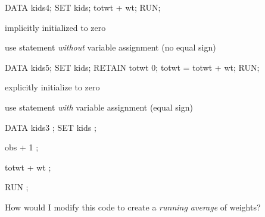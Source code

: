 \begin{frame}[fragile]
\footnotesize
\begin{code}{.0}
DATA kids4;
   SET kids;
   totwt + wt;
RUN;

\end{code}
\bi
\item {} implicitly initialized to zero
\item use  statement \emph{without} variable assignment (no equal sign)
\ei
\emp
{} \hspace{0.05in} \emp
{}
\footnotesize
\begin{code}{.0}
DATA kids5;
   SET kids;
   RETAIN totwt 0;
   totwt = totwt + wt;
RUN;
\end{code}
\bi
\item explicitly initialize  to zero
\item use  statement \emph{with} variable assignment (equal sign)
\item[]
\ei
\emp
\end{frame}


\begin{frame}[fragile]
\footnotesize
\begin{code}{.0}
DATA kids3 ;
   SET kids ;

   obs + 1 ;

   totwt + wt ;
   
 
   

RUN ;
\end{code}
\emp
{} \hspace{0.05in} \emp
{}
\oyo How would I modify this code to create a \emph{running average} of weights?  
\emp
\end{frame}

